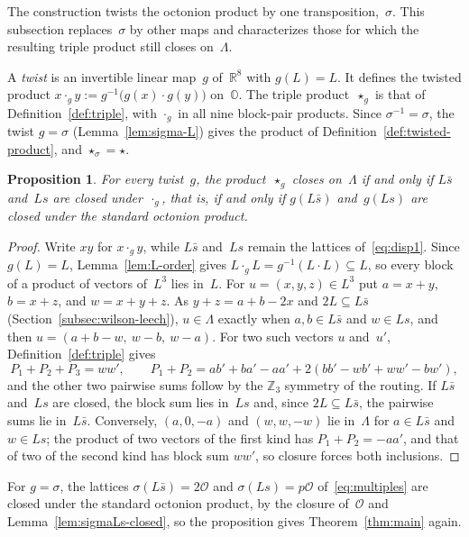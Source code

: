 \documentclass[twoside,english]{paper}
\numberwithin{equation}{section}
\numberwithin{figure}{section}
\newtheorem{proposition}[theorem]{Proposition}
\theoremstyle{definition}
\theoremstyle{remark}
\newcommand{\OO}{\mathbb{O}}          %
\newcommand{\MO}{\mathcal{O}}         %
\newcommand{\RR}{\mathbb{R}}
\newcommand{\ZZ}{\mathbb{Z}}
\newcommand{\LL}{\Lambda}             %
\begin{document}
The construction twists the octonion product by one
transposition,~$\sigma$.  This subsection replaces~$\sigma$ by other
maps and characterizes those for which the resulting triple product
still closes on~$\LL$.

A \emph{twist} is an invertible linear map~$g$ of~$\RR^8$ with
$g(L) = L$.  It defines the twisted product $x \cdot_g y :=
g^{-1}\bigl(g(x) \cdot g(y)\bigr)$ on~$\OO$.  The triple
product~$\star_g$ is that of Definition~\ref{def:triple}, with
$\cdot_g$ in all nine block-pair products.  Since $\sigma^{-1} = \sigma$,
the twist $g = \sigma$ (Lemma~\ref{lem:sigma-L}) gives the product of
Definition~\ref{def:twisted-product}, and $\star_\sigma = \star$.

\begin{proposition}\label{prop:criterion}
For every twist~$g$, the product~$\star_g$ closes on~$\LL$ if and only
if $L\bar s$ and~$Ls$ are closed under~$\cdot_g$, that is, if and only
if $g(L\bar s)$ and~$g(Ls)$ are closed under the standard octonion
product.
\end{proposition}

\begin{proof}
Write $xy$ for $x \cdot_g y$, while $L\bar s$ and~$Ls$ remain the
lattices of~\eqref{eq:disp1}.  Since $g(L) = L$,
Lemma~\ref{lem:L-order} gives $L \cdot_g L = g^{-1}(L \cdot L)
\subseteq L$, so every block of a product of vectors of~$L^3$ lies
in~$L$.  For $u = (x, y, z) \in L^3$ put $a = x + y$, $b = x + z$, and
$w = x + y + z$.  As $y + z = a + b - 2x$ and $2L \subseteq L\bar s$
(Section~\ref{subsec:wilson-leech}), $u \in \LL$ exactly when $a, b
\in L\bar s$ and $w \in Ls$, and then $u = (a + b - w,\ w - b,\ w -
a)$.  For two such vectors $u$ and~$u'$, Definition~\ref{def:triple}
gives
\[
  P_1 + P_2 + P_3 = ww', \qquad
  P_1 + P_2 = ab' + ba' - aa' + 2(bb' - wb' + ww' - bw'),
\]
and the other two pairwise sums follow by the $\ZZ_3$ symmetry of the
routing.  If $L\bar s$ and~$Ls$ are closed, the block sum lies in~$Ls$
and, since $2L \subseteq L\bar s$, the pairwise sums lie in~$L\bar s$.
Conversely, $(a, 0, -a)$ and $(w, w, -w)$ lie in~$\LL$ for $a \in L\bar
s$ and $w \in Ls$; the product of two vectors of the first kind has $P_1
+ P_2 = -aa'$, and that of two of the second kind has block sum $ww'$,
so closure forces both inclusions.
\end{proof}

For $g = \sigma$, the lattices $\sigma(L\bar s) = 2\MO$ and $\sigma(Ls) =
p\MO$ of~\eqref{eq:multiples} are closed under the standard octonion
product, by the closure of~$\MO$ and Lemma~\ref{lem:sigmaLs-closed}, so
the proposition gives Theorem~\ref{thm:main} again.
\end{document}
